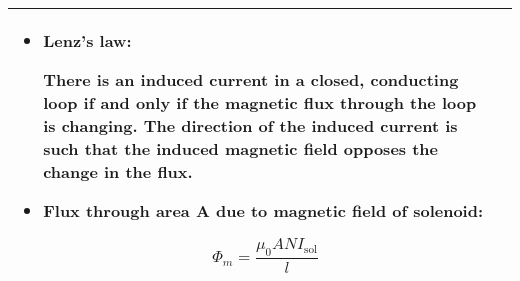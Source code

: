 \documentclass{article}
\begin{document}
\begin{center}
\begin{tabular}{|p{8cm}|p{8cm}|}
\begin{itemize}
			\item Lenz's law:

			      There is an induced current in a closed, conducting loop if
			      and only if the magnetic flux through the loop is changing.
			      The direction of the induced current is such that the induced
			      magnetic field opposes the change in the flux.

			\item Flux through area A due to magnetic field of solenoid:

			      \[ \Phi_m = \frac{\mu_0 A N I_\text{sol}}{l} \]

		\end{itemize}

		\\
		\hline
	\end{tabular}
\end{center}
\end{document}
